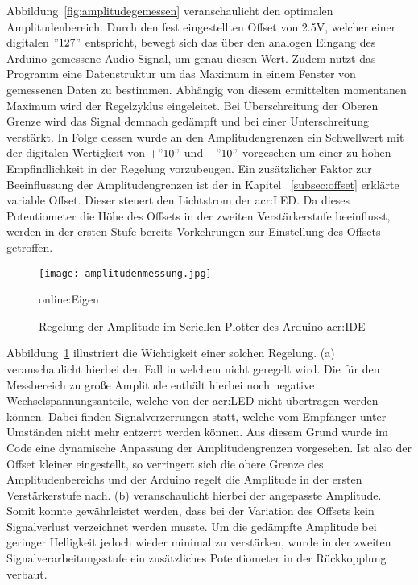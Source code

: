 Abbildung~\ref{fig:amplitudegemessen} veranschaulicht den optimalen Amplitudenbereich. Durch den fest eingestellten Offset von 2.5V, welcher einer digitalen $"127"$ entspricht, bewegt sich das über den analogen Eingang des Arduino gemessene Audio-Signal, um genau diesen Wert. Zudem nutzt das Programm eine Datenstruktur um das Maximum in einem Fenster von gemessenen Daten zu bestimmen. Abhängig von diesem ermittelten momentanen Maximum wird der Regelzyklus eingeleitet. Bei Überschreitung der Oberen Grenze wird das Signal demnach gedämpft und bei einer Unterschreitung verstärkt. In Folge dessen wurde an den Amplitudengrenzen ein Schwellwert mit der digitalen Wertigkeit von $+"10"$ und $-"10"$ vorgesehen um einer zu hohen Empfindlichkeit in der Regelung vorzubeugen. Ein zusätzlicher Faktor zur Beeinflussung der Amplitudengrenzen ist der in Kapitel ~\ref{subsec:offset} erklärte variable Offset. Dieser steuert den Lichtstrom der \gls{acr:LED}. Da dieses Potentiometer die Höhe des Offsets in der zweiten Verstärkerstufe beeinflusst, werden in der ersten Stufe bereits Vorkehrungen zur Einstellung des Offsets getroffen. 

 
 \begin{figure}[H]
 	\centering
 	\texttt{[image: amplitudenmessung.jpg]}
 	\caption[Regelung der Amplitude im Seriellen Plotter der Arduino \gls{acr:IDE}]{Regelung der Amplitude im Seriellen Plotter des Arduino \gls{acr:IDE}} 
 	\gls{online:Eigen}
 	\label{fig:ampregel}
 \end{figure}
 
 Abbildung~\ref{fig:ampregel} illustriert die Wichtigkeit einer solchen Regelung. (a) veranschaulicht hierbei den Fall in welchem nicht geregelt wird. Die für den Messbereich zu große Amplitude enthält hierbei noch negative Wechselspannungsanteile, welche von der \gls{acr:LED} nicht übertragen werden können. Dabei finden Signalverzerrungen statt, welche vom Empfänger unter Umständen nicht mehr entzerrt werden können. Aus diesem Grund wurde im Code eine dynamische Anpassung der Amplitudengrenzen vorgesehen. Ist also der Offset kleiner eingestellt, so verringert sich die obere Grenze des Amplitudenbereichs und der Arduino regelt die Amplitude in der ersten Verstärkerstufe nach. (b) veranschaulicht hierbei der angepasste Amplitude. Somit konnte gewährleistet werden, dass bei der Variation des Offsets kein Signalverlust verzeichnet werden musste. Um die gedämpfte Amplitude bei geringer Helligkeit jedoch wieder minimal zu verstärken, wurde in der zweiten Signalverarbeitungsstufe ein zusätzliches Potentiometer in der Rückkopplung verbaut.
\newpage
